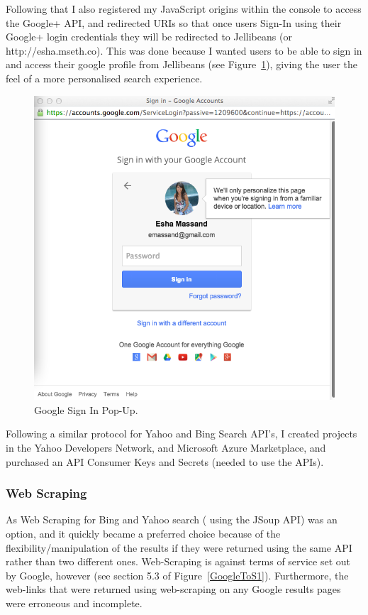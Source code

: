 \documentclass[a4paper, 11pt]{article}
\begin{document}
Following that I also registered my JavaScript origins within the console to access the Google+ API, and redirected URIs so that once users Sign-In using their Google+ login credentials they will be redirected to Jellibeans (or http://esha.mseth.co). This was done because I wanted users to be able to sign in and access their google profile from Jellibeans (see Figure~\ref{GoogleSignInPage}), giving the user the feel of a more personalised search experience. 

\begin{figure}[H]
\begin{center}
\includegraphics[scale=0.3]{GoogleSignIn}
\end{center}
\caption{Google Sign In Pop-Up.}
\label{GoogleSignInPage}

\end{figure}

Following a similar protocol for Yahoo and Bing Search API's, I created projects in the Yahoo Developers Network, and Microsoft Azure Marketplace, and purchased an API Consumer Keys and Secrets (needed to use the APIs). 

\subsubsection{Web Scraping}
As Web Scraping for Bing and Yahoo search ( using the JSoup API) was an option, and it quickly became a preferred choice because of the flexibility/manipulation of the results if they were returned using the same API rather than two different ones. Web-Scraping is against terms of service set out by Google, however (see section 5.3 of Figure~\ref{GoogleToS1}). Furthermore, the web-links that were returned using web-scraping on any Google results pages were erroneous and incomplete.
\end{document}
